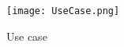 %

%
%
%

\begin{figure}[htb]
	\centering
	\texttt{[image: UseCase.png]}
	\caption{Use case}
	\label{fig:usecase}
\end{figure}
